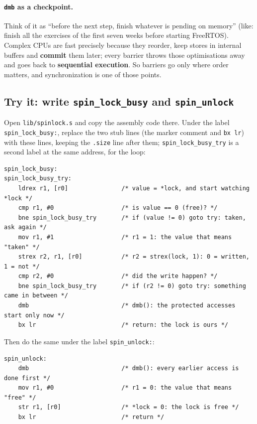 \paragraph{\texttt{dmb} as a checkpoint.} Think of it as ``before the next step, finish whatever is pending on memory'' (like: finish all the exercises of the first seven weeks before starting FreeRTOS). Complex CPUs are fast precisely because they reorder, keep stores in internal buffers and \textbf{commit} them later; every barrier throws those optimisations away and goes back to \textbf{sequential execution}. So barriers go only where order matters, and synchronization is one of those points.

\subsection{Try it: write \texttt{spin\_lock\_busy} and \texttt{spin\_unlock}}
Open \texttt{lib/spinlock.s} and copy the assembly code there. Under the label \texttt{spin\_lock\_busy:}, replace the two stub lines (the marker comment and \texttt{bx lr}) with these lines, keeping the \texttt{.size} line after them; \texttt{spin\_lock\_busy\_try} is a second label at the same address, for the loop:
\begin{lstlisting}[basicstyle=\ttfamily\scriptsize]
spin_lock_busy:
spin_lock_busy_try:
    ldrex r1, [r0]               /* value = *lock, and start watching *lock */
    cmp r1, #0                   /* is value == 0 (free)? */
    bne spin_lock_busy_try       /* if (value != 0) goto try: taken, ask again */
    mov r1, #1                   /* r1 = 1: the value that means "taken" */
    strex r2, r1, [r0]           /* r2 = strex(lock, 1): 0 = written, 1 = not */
    cmp r2, #0                   /* did the write happen? */
    bne spin_lock_busy_try       /* if (r2 != 0) goto try: something came in between */
    dmb                          /* dmb(): the protected accesses start only now */
    bx lr                        /* return: the lock is ours */
\end{lstlisting}
Then do the same under the label \texttt{spin\_unlock:}:
\begin{lstlisting}[basicstyle=\ttfamily\scriptsize]
spin_unlock:
    dmb                          /* dmb(): every earlier access is done first */
    mov r1, #0                   /* r1 = 0: the value that means "free" */
    str r1, [r0]                 /* *lock = 0: the lock is free */
    bx lr                        /* return */
\end{lstlisting}
